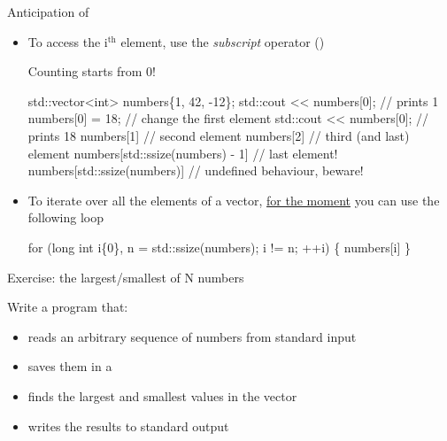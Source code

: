 \begin{frame}[fragile]{Anticipation of  \insertcontinuationtext}

  \begin{itemize}
  \item To access the i$^{\textrm{th}}$ element, use the \textit{subscript}
    operator (\code{[]})

    \begin{center}
      \huge\alert{Counting starts from $0$!}
    \end{center}

    \begin{codeblock}
std::vector<int> numbers\{1, 42, -12\};
std::cout << numbers[0];                   // prints 1
numbers[0] = 18;                           // change the first element
std::cout << numbers[0];                   // prints 18
\ddd numbers[1] \ddd                          // second element
\ddd numbers[2] \ddd                          // third (and last) element
\ddd numbers[std::ssize(numbers) - 1] \ddd    // last element!
\ddd numbers[std::ssize(numbers)] \ddd        // undefined behaviour, beware!\end{codeblock}

  \item<2-> To iterate over all the elements of a vector, \underline{for the moment}
    you can use the following loop
    \begin{codeblock}
for (long int i\{0\}, n = std::ssize(numbers); i != n; ++i) \{
  \ddd numbers[i] \ddd
\}\end{codeblock}

  \end{itemize}

\end{frame}

\begin{frame}{Exercise: the largest/smallest of N numbers \insertcontinuationtext}

  Write a program that:
  \begin{itemize}
  \item reads an arbitrary sequence of numbers from standard input
  \item saves them in a 
  \item finds the largest and smallest values in the vector
  \item writes the results to standard output 
  \end{itemize}

\end{frame}

